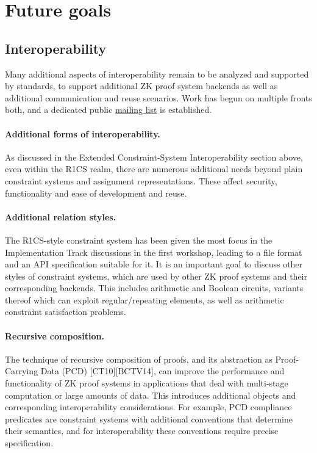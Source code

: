 \section{Future goals}
\label{implem:goals}


\subsection{Interoperability}

Many additional aspects of interoperability remain to be analyzed and supported by standards, to support additional ZK proof system backends as well as additional communication and reuse scenarios. Work has begun on multiple fronts both, and a dedicated public \href{https://groups.google.com/a/zkproof.org/forum/\#!forum/interoperability}{mailing list} is established.

\paragraph{Additional forms of interoperability.}
As discussed in the Extended Constraint-System Interoperability section above, even within the R1CS realm, there are numerous additional needs beyond plain constraint systems and assignment representations. These affect security, functionality and ease of development and reuse.


\paragraph{Additional relation styles.}
The R1CS-style constraint system has been given the most focus in the Implementation Track discussions in the first workshop, leading to a file format and an API specification suitable for it. It is an important goal to discuss other styles of constraint systems, which are used by other ZK proof systems and their corresponding backends. This includes arithmetic and Boolean circuits, variants thereof which can exploit regular/repeating elements, as well as arithmetic constraint satisfaction problems.


\paragraph{Recursive composition.}
The technique of recursive composition of proofs, and its abstraction as Proof-Carrying Data (PCD) [CT10][BCTV14], can improve the performance and functionality of ZK proof systems in applications that deal with multi-stage computation or large amounts of data. This introduces additional objects and corresponding interoperability considerations. For example, PCD compliance predicates are constraint systems with additional conventions that determine their semantics, and for interoperability these conventions require precise specification.


